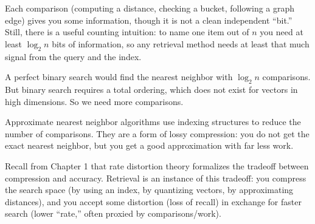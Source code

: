 Each comparison (computing a distance, checking a bucket, following a graph edge) gives you some information, though it is not a clean independent ``bit.'' Still, there is a useful counting intuition: to name one item out of $n$ you need at least $\log_2 n$ bits of information, so any retrieval method needs at least that much signal from the query and the index.

\vspace{1em}

A perfect binary search would find the nearest neighbor with $\log_2 n$ comparisons. But binary search requires a total ordering, which does not exist for vectors in high dimensions. So we need more comparisons.

Approximate nearest neighbor algorithms use indexing structures to reduce the number of comparisons. They are a form of lossy compression: you do not get the exact nearest neighbor, but you get a good approximation with far less work.

\vspace{1em}

Recall from Chapter 1 that rate distortion theory formalizes the tradeoff between compression and accuracy. Retrieval is an instance of this tradeoff: you compress the search space (by using an index, by quantizing vectors, by approximating distances), and you accept some distortion (loss of recall) in exchange for faster search (lower ``rate,'' often proxied by comparisons/work).

\vspace{1.5em}

